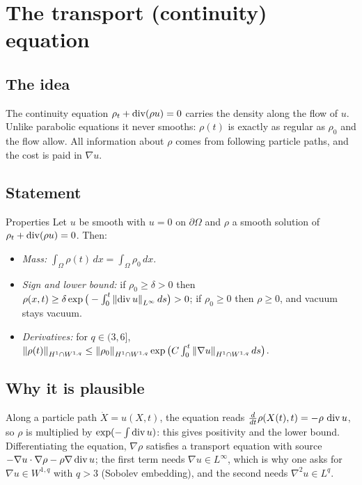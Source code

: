 
\section{The transport (continuity) equation}\label{p:transport-equation}


\subsection*{The idea}

The continuity equation $\rho_t+\operatorname{div}(\rho u)=0$ carries the density along the flow of $u$. Unlike parabolic equations it never smooths: $\rho(t)$ is exactly as regular as $\rho_0$ and the flow allow. All information about $\rho$ comes from following particle paths, and the cost is paid in $\nabla u$.

\subsection*{Statement}

\begin{thmbox}{Properties}
%
Let $u$ be smooth with $u=0$ on $\partial\Omega$ and $\rho$ a smooth solution of $\rho_t+\operatorname{div}(\rho u)=0$. Then:

\begin{itemize}
\item \emph{Mass:} $\int_\Omega\rho(t)\,dx=\int_\Omega\rho_0\,dx$.
\item \emph{Sign and lower bound:} if $\rho_0\ge\delta> 0$ then $\rho(x,t)\ge\delta\exp\big(-\int_0^t\left\lVert \operatorname{div} u\right\rVert_{L^\infty}ds\big)> 0$; if $\rho_0\ge0$ then $\rho\ge0$, and vacuum stays vacuum.
\item \emph{Derivatives:} for $q\in(3,6]$, $\left\lVert \rho(t)\right\rVert_{H^1\cap W^{1,q}}\le\left\lVert \rho_0\right\rVert_{H^1\cap W^{1,q}}\exp\big(C\int_0^t\left\lVert \nabla u\right\rVert_{H^1\cap W^{1,q}}ds\big)$.
\end{itemize}
\end{thmbox}

\subsection*{Why it is plausible}

Along a particle path $\dot X = u(X,t)$, the equation reads $\frac{d}{dt}\rho(X(t),t) = -\rho\,\operatorname{div} u$, so $\rho$ is multiplied by $\exp(-\int\operatorname{div} u)$: this gives positivity and the lower bound. Differentiating the equation, $\nabla\rho$ satisfies a transport equation with source $-\nabla u\cdot\nabla\rho - \rho\nabla\operatorname{div} u$; the first term needs $\nabla u\in L^\infty$, which is why one asks for $\nabla u\in W^{1,q}$ with $q> 3$ (Sobolev embedding), and the second needs $\nabla^2 u\in L^q$.

